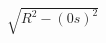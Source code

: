 \documentclass[preview]{standalone}
\begin{document}
\begin{align*}
\sqrt{R^2 - (0s)^2}
\end{align*}
\end{document}
